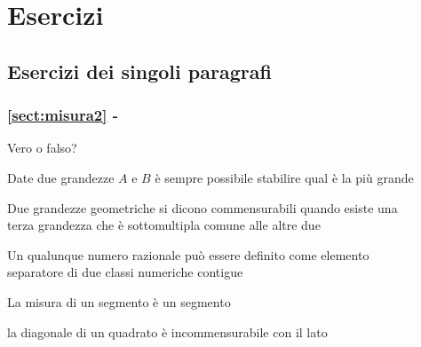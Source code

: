
\begin{comment}
\noindent\begin{minipage}{.5\textwidth}

\end{minipage}
\begin{minipage}{.5\textwidth}
\begin{inaccessibleblock}[Figura: TODO]
 \begin{center}  \end{center}
\end{inaccessibleblock}
\end{minipage}
\end{comment}

\section{Esercizi}

\subsection{Esercizi dei singoli paragrafi}

\begingroup
\hypersetup{linkcolor=black}
\subsubsection*{\ref{sect:misura2} - }
\endgroup

\begin{esercizio}
\label{ese:6.1}
Vero o falso?
\begin{enumeratea}
\item Date due grandezze $A$ e $B$ è sempre possibile stabilire qual 
è la più grande
\hfill\boxV\quad\boxF
\item Due grandezze geometriche si dicono commensurabili quando esiste una \\
terza grandezza che è sottomultipla comune alle altre due 
\hfill{\boxV\quad\boxF}
\item Un qualunque numero razionale può essere definito come elemento \\
separatore di due classi numeriche contigue
\hfill\boxV\quad\boxF
\item La misura di un segmento è un segmento
\hfill\boxV\quad\boxF
\item la diagonale di un quadrato è incommensurabile con il lato
\hfill\boxV\quad\boxF
\end{enumeratea}
\end{esercizio}

